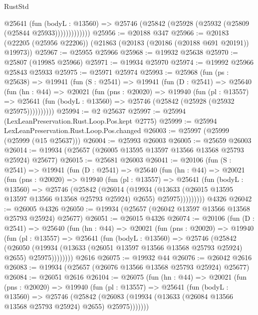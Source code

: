 \begin{lexlean}{RustStd}
\begin{coremodule}
                @25641
                  (fun (bodyL : @13560) =>
                  @25746 (@25842 (@25928 (@25932 (@25809 (@25844 @25933)))))))))))))
@25956 := @20188 @347
@25966 := @20183 (@22205 (@25956 @22206)) (@21863 (@20183 (@20186 (@20188 @691 @20191)) @19973))
@25967 := @25955 @25966
@25968 := @19932 @25638
@25970 := @25807 (@19985 @25966)
@25971 := @19934 @25970
@25974 := @19992 @25966 @25843 @25933
@25975 := @25971 @25974
@25993 := @25968
    (fun (ps : @25638) =>
    @19941
      (fun (S : @2541) =>
      @19941
        (fun (D : @2541) =>
        @25640
          (fun (hn : @44) =>
          @20021
            (fun (pns : @20020) =>
            @19940
              (fun (pl : @13557) =>
              @25641 (fun (bodyL : @13560) => @25746 (@25842 (@25928 (@25932 @25975))))))))))
@25994 := @2 @25637
@25997 := @25994 (LexLeanPreservation.Rust.Loop.Pos.kept @2775)
@25999 := @25994 LexLeanPreservation.Rust.Loop.Pos.changed
@26003 := @25997 (@25999 (@25999 (@15 @25637)))
@26004 := @25993 @26003
@26005 := @25659 @26003
@26014 := @19934 (@25657 (@26005 @13595 @13597 @13566 @13568 @25793 @25924) @25677)
@26015 := @25681 @26003
@26041 := @20106
    (fun (S : @2541) =>
    @19941
      (fun (D : @2541) =>
      @25640
        (fun (hn : @44) =>
        @20021
          (fun (pns : @20020) =>
          @19940
            (fun (pl : @13557) =>
            @25641
              (fun (bodyL : @13560) =>
              @25746
                (@25842
                  (@26014
                    (@19934
                      (@13633 (@26015 @13595 @13597 @13566 @13568 @25793 @25924) @2655)
                      @25975)))))))))
    @4326
@26042 := @26005 @4326
@26050 := @19934 (@25657 (@26042 @13597 @13566 @13568 @25793 @25924) @25677)
@26051 := @26015 @4326
@26074 := @20106
    (fun (D : @2541) =>
    @25640
      (fun (hn : @44) =>
      @20021
        (fun (pns : @20020) =>
        @19940
          (fun (pl : @13557) =>
          @25641
            (fun (bodyL : @13560) =>
            @25746
              (@25842
                (@26050
                  (@19934 (@13633 (@26051 @13597 @13566 @13568 @25793 @25924) @2655) @25975))))))))
    @2616
@26075 := @19932 @44
@26076 := @26042 @2616
@26083 := @19934 (@25657 (@26076 @13566 @13568 @25793 @25924) @25677)
@26084 := @26051 @2616
@26104 := @26075
    (fun (hn : @44) =>
    @20021
      (fun (pns : @20020) =>
      @19940
        (fun (pl : @13557) =>
        @25641
          (fun (bodyL : @13560) =>
          @25746
            (@25842
              (@26083 (@19934 (@13633 (@26084 @13566 @13568 @25793 @25924) @2655) @25975)))))))

\end{coremodule}
\end{lexlean}
